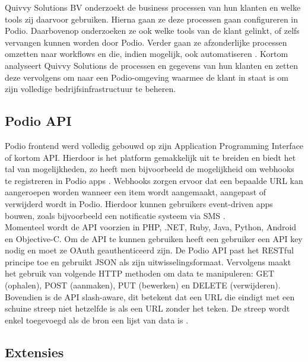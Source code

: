 Quivvy Solutions BV onderzoekt de business processen van hun klanten en welke tools zij daarvoor gebruiken. Hierna gaan ze deze processen gaan configureren in Podio. Daarbovenop onderzoeken ze ook welke tools van de klant gelinkt, of zelfs vervangen kunnen worden door Podio. Verder gaan ze afzonderlijke processen omzetten naar workflows en die, indien mogelijk, ook automatiseren \autocite{QuivvySoftware}. Kortom analyseert Quivvy Solutions de processen en gegevens van hun klanten en zetten deze vervolgens om naar een Podio-omgeving waarmee de klant in staat is om zijn volledige bedrijfsinfrastructuur te beheren. \\

\subsection{Podio API}
\label{subsec:podio_API}

Podio frontend werd volledig gebouwd op zijn Application Programming Interface of kortom API. Hierdoor is het platform gemakkelijk uit te breiden en biedt het tal van mogelijkheden, zo heeft men bijvoorbeeld de mogelijkheid om webhooks te registreren in Podio apps \autocite{PodioAPI2023}. Webhooks zorgen ervoor dat een bepaalde URL kan aangeroepen worden wanneer een item wordt aangemaakt, aangepast of verwijderd wordt in Podio. Hierdoor kunnen gebruikers event-driven apps bouwen, zoals bijvoorbeeld een notificatie systeem via SMS \autocite{PodioAPIWebhooks}. \\

Momenteel wordt de API voorzien in PHP, .NET, Ruby, Java, Python, Android en Objective-C. Om de API te kunnen gebruiken heeft een gebruiker een API key nodig en moet ze OAuth geauthenticeerd zijn. De Podio API past het RESTful principe toe en gebruikt JSON als zijn uitwisselingsformaat. Vervolgens maakt het gebruik van volgende HTTP methoden om data te manipuleren: GET (ophalen), POST (aanmaken), PUT (bewerken) en DELETE (verwijderen). Bovendien is de API slash-aware, dit betekent dat een URL die eindigt met een schuine streep niet hetzelfde is als een URL zonder het teken. De streep wordt enkel toegevoegd als de bron een lijst van data is \autocite{PodioAPIConcepts}. \\


\subsection{Extensies}
\label{subsec:podio_extensies}


